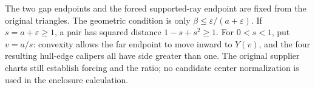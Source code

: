 The two gap endpoints and the forced supported-ray endpoint are fixed from
the original triangles. The geometric condition is only
$\beta\le\varepsilon/(a+\varepsilon)$. If $s=a+\varepsilon\ge1$,
a pair has squared distance $1-s+s^2\ge1$. For $0<s<1$, put $v=a/s$:
convexity allows the far endpoint to move inward to $Y(v)$, and the four
resulting hull-edge calipers all have side greater than one.
The original supplier charts still establish forcing and the ratio; no
candidate center normalization is used in the enclosure calculation.
